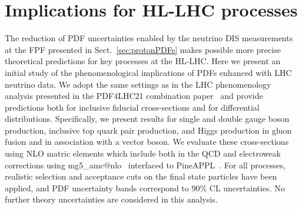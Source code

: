 \section{Implications for HL-LHC processes}
\label{sec:pheno}

The reduction of PDF uncertainties enabled by the neutrino DIS measurements
at the FPF presented in Sect.~\ref{sec:protonPDFs}
makes possible more precise theoretical predictions for key processes at the
HL-LHC.
%
Here we present an initial study of the phenomenological implications
of PDFs enhanced with LHC neutrino data.
%
We adopt the same settings as in the LHC phenomenology analysis presented
in the PDF4LHC21 combination paper~\cite{PDF4LHCWorkingGroup:2022cjn} and provide predictions
both for inclusive fiducial cross-sections and for differential distributions.
%
Specifically, we present results for 
single and double gauge boson production, inclusive top quark pair production,
and Higgs production in gluon
fusion and in association with a vector boson.
%
We evaluate these cross-sections using NLO matric elements
which include  both in the
QCD and electroweak corrections using
{\sc\small mg5\_amc@nlo}~\cite{Frederix:2018nkq}
interfaced to {\sc\small PineAPPL}~\cite{Carrazza:2020gss}.
%
For all processes, realistic selection and acceptance cuts on the final state particles
have been applied, and PDF uncertainty bands correspond to 90\% CL
uncertainties.
%
No further theory uncertainties are considered in this
analysis.
